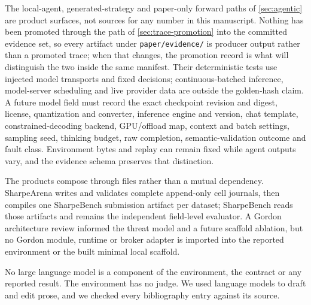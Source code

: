 The local-agent, generated-strategy and paper-only forward paths of \cref{sec:agentic} are product surfaces, not sources for any number in this manuscript. Nothing has been promoted through the path of \cref{sec:trace-promotion} into the committed evidence set, so every artifact under \texttt{paper/evidence/} is producer output rather than a promoted trace; when that changes, the promotion record is what will distinguish the two inside the same manifest. Their deterministic tests use injected model transports and fixed decisions; continuous-batched inference, model-server scheduling and live provider data are outside the golden-hash claim. A future model field must record the exact checkpoint revision and digest, license, quantization and converter, inference engine and version, chat template, constrained-decoding backend, GPU/offload map, context and batch settings, sampling seed, thinking budget, raw completion, semantic-validation outcome and fault class. Environment bytes and replay can remain fixed while agent outputs vary, and the evidence schema preserves that distinction.

The products compose through files rather than a mutual dependency. SharpeArena writes and validates complete append-only cell journals, then compiles one SharpeBench submission artifact per dataset; SharpeBench reads those artifacts and remains the independent field-level evaluator. A Gordon architecture review informed the threat model and a future scaffold ablation, but no Gordon module, runtime or broker adapter is imported into the reported environment or the built minimal local scaffold.

No large language model is a component of the environment, the contract or any reported result. The environment has no judge. We used language models to draft and edit prose, and we checked every bibliography entry against its source.
